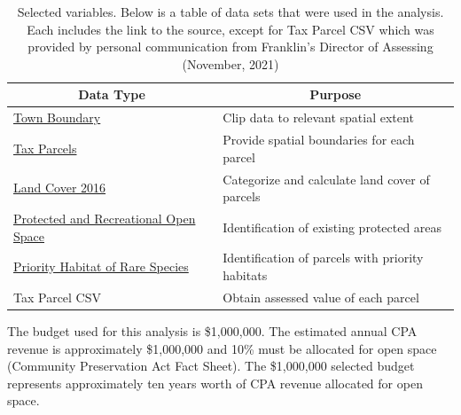 \documentclass[12pt, stu, floatsintext,table]{apa7}
\begin{document}
\begin{table}[htbp]
\centering
\caption{Selected variables. Below is a table of data sets that were used in the analysis. Each includes the link to the source, except for Tax Parcel CSV which was provided by personal communication from Franklin's Director of Assessing (November, 2021)}
\begin{tabular}{@{}ll@{}}
\toprule
\multicolumn{1}{c}{Data Type} & \multicolumn{1}{c}{Purpose}             \\ \midrule
\href{https://www.mass.gov/info-details/massgis-data-municipalities}{Town Boundary}                                               & Clip data to relevant spatial extent              \\
\href{https://www.mass.gov/info-details/massgis-data-property-tax-parcels}{Tax Parcels}                                           & Provide spatial boundaries for each parcel        \\
\href{https://www.fisheries.noaa.gov/inport/item/54917}{Land Cover 2016}                                                          & Categorize and calculate land cover of parcels \\
\href{https://www.mass.gov/info-details/massgis-data-protected-and-recreational-openspace}{Protected and Recreational Open Space} & Identification of existing protected areas        \\
\href{https://www.mass.gov/info-details/massgis-data-nhesp-priority-habitats-of-rare-species}{Priority Habitat of Rare Species}   & Identification of parcels with priority habitats  \\
Tax Parcel CSV                                                                                                                    & Obtain assessed value of each parcel              \\ \bottomrule
\end{tabular}
\end{table}


The budget used for this analysis is \$1,000,000. The estimated annual CPA revenue is approximately \$1,000,000 and 10\% must be allocated for open space (Community Preservation Act Fact Sheet). The \$1,000,000 selected budget represents approximately ten years worth of CPA revenue allocated for open space. 
\end{document}
